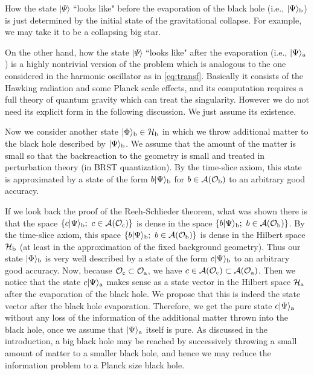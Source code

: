 \documentclass[12pt,a4paper]{article}
\theoremstyle{plain}
\theoremstyle{definition}
\numberwithin{thm}{section}
\newcommand{\ket}[1]{ | {#1} \rangle }
\def\CA{{\cal A}}
\def\CH{{\cal H}}
\def\CO{{\cal O}}
\begin{document}
How the state $\ket{\Psi}$ ``looks like" before the evaporation of the black hole (i.e., $\ket{\Psi}_{\rm b}$) is just determined by the initial state of the gravitational collapse. For example, 
we may take it to be a collapsing big star.

On the other hand, how the state $\ket{\Psi}$ ``looks like" after the evaporation (i.e., $\ket{\Psi}_{\rm a}$) is a highly nontrivial version of the problem which is
analogous to the one considered in the harmonic oscillator 
as in \eqref{eq:transf}. Basically it consists of the Hawking radiation and some Planck scale effects, and its computation requires a full theory of quantum gravity which can treat the singularity.
However we do not need its explicit form in the following discussion. We just assume its existence. 


Now we consider another state $\ket{\Phi}_{\rm b} \in \CH_{\rm b}$ in which we throw additional matter to the black hole described by $\ket{\Psi}_{\rm b}$.
We assume that the amount of the matter is small so that the backreaction to the geometry is small and treated in perturbation theory (in BRST quantization).
By the time-slice axiom, this state is approximated by a state of the form  $ b\ket{\Psi}_{\rm b}$ for $b \in \CA(\CO_{\rm b})$ to an arbitrary good accuracy. 

If we look back the proof of the Reeh-Schlieder theorem, what was shown there is that
the space $\{  c\ket{\Psi}_{\rm b};\  c \in \CA(\CO_{\rm c}) \}$ is dense in the space $\{  b\ket{\Psi}_{\rm b};\ b \in \CA(\CO_{\rm b}) \}$.
By the time-slice axiom, this space $\{  b\ket{\Psi}_{\rm b};\ b \in \CA(\CO_{\rm b}) \}$ is dense in the Hilbert space $\CH_{\rm b}$
(at least in the approximation of the fixed background geometry).
Thus our state $\ket{\Phi}_{\rm b}$ is very well described by a state of the form $c \ket{\Psi}_{\rm b}$ to an arbitrary good accuracy.
Now, because $\CO_{\rm c} \subset \CO_{\rm a}$, we have $c \in \CA(\CO_{\rm c}) \subset \CA(\CO_{\rm a}) $.
Then we notice that the state $c \ket{\Psi}_{\rm a}$ makes sense as a state vector in the Hilbert space $\CH_{\rm a}$ after the evaporation of the black hole.
We propose that this is indeed the state vector after the black hole evaporation.
Therefore, we get the pure state $c \ket{\Psi}_{\rm a}$ without any loss of the information of the additional matter thrown into the black hole,
once we assume that $\ket{\Psi}_{\rm a}$ itself is pure. As discussed in the introduction, a big black hole may be reached by successively throwing a small amount of matter to a smaller black hole,
and hence we may reduce the information problem to a Planck size black hole.
\end{document}

